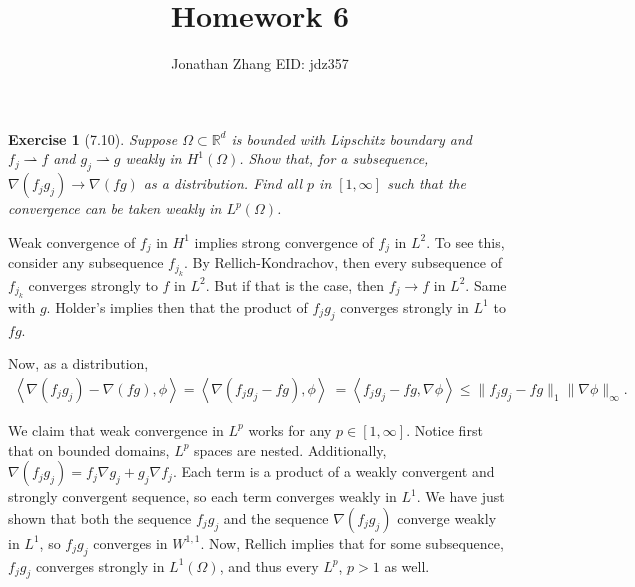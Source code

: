 \documentclass[letterpaper,twoside,11pt]{article}
\theoremstyle{mystyle}
\newtheorem*{exercise}{Exercise}
\newcommand{\R}{{\mathbb R}}
\begin{document}
\title{\vspace{-2\baselineskip} 
Homework 6
}
\author{Jonathan Zhang \qquad EID: { jdz357} }
\date{}
\maketitle



\begin{exercise}[7.10]
Suppose $\Omega\subset \R^d$ is bounded with Lipschitz boundary and $f_j \rightharpoonup f$ and $g_j\rightharpoonup g$ weakly in $H^1\left( \Omega \right)$. Show that, for a subsequence, $\nabla \left( f_jg_j \right) \to \nabla (fg)$ as a distribution. Find all $p$ in $[1,\infty]$ such that the convergence can be taken weakly in $L^p\left( \Omega \right)$. 
\end{exercise}

Weak convergence of $f_j$ in $H^1$ implies strong convergence of $f_j$ in $L^2$. To see this, consider any subsequence $f_{j_k}$. By Rellich-Kondrachov, then every subsequence of $f_{j_k}$ converges strongly to $f$ in $L^2$. But if that is the case, then $f_j \to f$ in $L^2$. Same with $g$. 
Holder's implies then that the product of $f_jg_j$ converges strongly in $L^1$ to $fg$. 

Now, as a distribution, 
\begin{align*}
  \left\langle \nabla (f_jg_j) - \nabla (fg) , \phi \right\rangle = \left\langle \nabla ( f_jg_j - fg ) , \phi \right\rangle\ = \left\langle f_jg_j - fg, \nabla \phi \right\rangle \leq \|f_jg_j - fg\|_1 \|\nabla \phi\|_\infty.
\end{align*}

We claim that weak convergence in $L^p$ works for any $p \in [1, \infty]$. Notice first that on bounded domains, $L^p$ spaces are nested. Additionally, $\nabla(f_j g_j ) = f_j \nabla g_j + g_j \nabla f_j$. Each term is a product of a weakly convergent and strongly convergent sequence, so each term converges weakly in $L^1$. We have just shown that both the sequence $f_j g_j $ and the sequence $\nabla (f_j g_j)$ converge weakly in $L^1$, so $f_j g_j$ converges in $W^{1, 1}$. Now, Rellich implies that for some subsequence, $f_j g_j$ converges strongly in $L^1\left( \Omega \right)$, and thus every $L^p$, $p > 1$ as well. 
\end{document}
